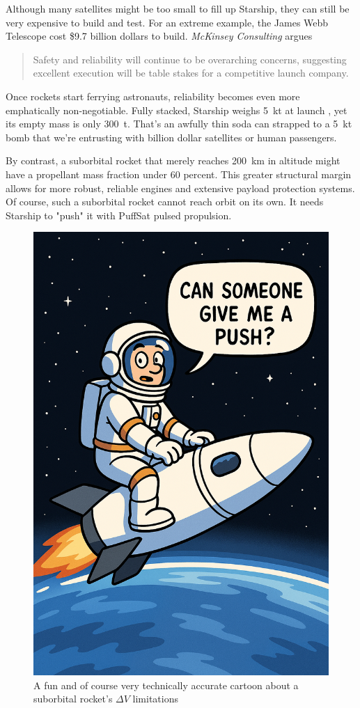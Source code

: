 \documentclass{article}
\begin{document}
{Although many satellites might be too small to fill up Starship, they can still be very expensive to build and test. For an extreme example, the James Webb Telescope \cite{james_webb_space_telescope} cost \$9.7 billion dollars \cite{jwst_cost} to build. \textit{McKinsey Consulting} argues 

\begin{quote}
Safety and reliability will continue to be overarching concerns, suggesting excellent execution will be table stakes for a competitive launch company. \cite{mckinsey_reliability}
\end{quote}

Once rockets start ferrying astronauts, reliability becomes even more emphatically non-negotiable. Fully stacked, Starship weighs \SI{5}{\kilo\tonne} at launch \cite{starship}, yet its empty mass is only \SI{300}{\tonne}. That’s an awfully thin soda can strapped to a \SI{5}{\kilo\tonne} bomb that we're entrusting with billion dollar satellites or human passengers.

By contrast, a suborbital rocket that merely reaches \SI{200}{\kilo\meter} in altitude might have a propellant mass fraction under 60 percent. This greater structural margin allows for more robust, reliable engines and extensive payload protection systems. Of course, such a suborbital rocket cannot reach orbit on its own.  It needs Starship to "push" it with PuffSat pulsed propulsion.

\begin{figure}[htpb]
    \centering
    \includegraphics[width=0.5\linewidth]{images/new_push_picture.png}
    \caption{A fun and of course very technically accurate cartoon about a suborbital rocket's $\Delta V$ limitations}
    \label{fig:suborbital-cartoon}
\end{figure}

}
\end{document}
